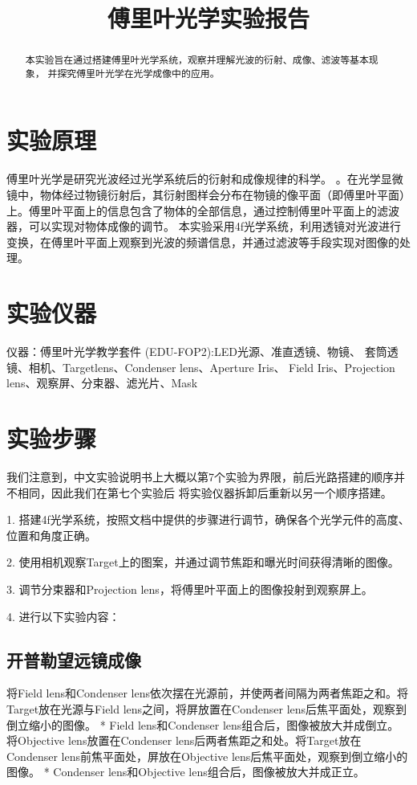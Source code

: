 \documentclass{ctexart}
\title{傅里叶光学实验报告}
\begin{document}
\maketitle

\begin{abstract}
  本实验旨在通过搭建傅里叶光学系统，观察并理解光波的衍射、成像、滤波等基本现象，
  并探究傅里叶光学在光学成像中的应用。
\end{abstract}

\section{实验原理}
傅里叶光学是研究光波经过光学系统后的衍射和成像规律的科学。
。在光学显微镜中，物体经过物镜衍射后，其衍射图样会分布在物镜的像平面（即傅里叶平面）上。傅里叶平面上的信息包含了物体的全部信息，通过控制傅里叶平面上的滤波器，可以实现对物体成像的调节。
本实验采用4f光学系统，利用透镜对光波进行变换，在傅里叶平面上观察到光波的频谱信息，并通过滤波等手段实现对图像的处理。

\section{实验仪器}
  仪器：傅里叶光学教学套件 (EDU-FOP2):LED光源、准直透镜、物镜、
  套筒透镜、相机、Targetlens、Condenser lens、Aperture Iris、
  Field Iris、Projection lens、观察屏、分束器、滤光片、Mask

\section{实验步骤}
我们注意到，中文实验说明书上大概以第7个实验为界限，前后光路搭建的顺序并不相同，因此我们在第七个实验后
将实验仪器拆卸后重新以另一个顺序搭建。

1. 搭建4f光学系统，按照文档中提供的步骤进行调节，确保各个光学元件的高度、位置和角度正确。

2. 使用相机观察Target上的图案，并通过调节焦距和曝光时间获得清晰的图像。

3. 调节分束器和Projection lens，将傅里叶平面上的图像投射到观察屏上。

4. 进行以下实验内容：

\subsection{开普勒望远镜成像}
将Field lens和Condenser lens依次摆在光源前，并使两者间隔为两者焦距之和。将Target放在光源与Field lens之间，将屏放置在Condenser lens后焦平面处，观察到倒立缩小的图像。
* Field lens和Condenser lens组合后，图像被放大并成倒立。
将Objective lens放置在Condenser lens后两者焦距之和处。将Target放在Condenser lens前焦平面处，屏放在Objective lens后焦平面处，观察到倒立缩小的图像。
* Condenser lens和Objective lens组合后，图像被放大并成正立。
\end{document}
